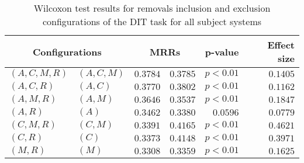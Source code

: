 
\begin{table}
\begin{spacing}{1.2}
\centering
\caption{Wilcoxon test results for removals inclusion and exclusion configurations of the DIT task for all subject systems}
\label{table:versus-wilcox-all-dit-removals}
\begin{tabular}{ll|rr|rr}
\toprule
      \multicolumn{2}{c|}{Configurations} &          \multicolumn{2}{c|}{MRRs} &       p-value & Effect size \\
\midrule
 $(A,C,M,R)$ &  $(A,C,M)$ & $0.3784$ & $0.3785$ & $p<0.01$ &    $0.1405$ \\
   $(A,C,R)$ &    $(A,C)$ & $0.3770$ & $0.3802$ & $p<0.01$ &    $0.1162$ \\
   $(A,M,R)$ &    $(A,M)$ & $0.3646$ & $0.3537$ & $p<0.01$ &    $0.1847$ \\
     $(A,R)$ &      $(A)$ & $0.3462$ & $0.3380$ & $0.0596$ &    $0.0779$ \\
   $(C,M,R)$ &    $(C,M)$ & $0.3391$ & $0.4165$ & $p<0.01$ &    $0.4621$ \\
     $(C,R)$ &      $(C)$ & $0.3373$ & $0.4148$ & $p<0.01$ &    $0.3971$ \\
     $(M,R)$ &      $(M)$ & $0.3308$ & $0.3359$ & $p<0.01$ &    $0.1625$ \\
\bottomrule
\end{tabular}

\end{spacing}
\end{table}

